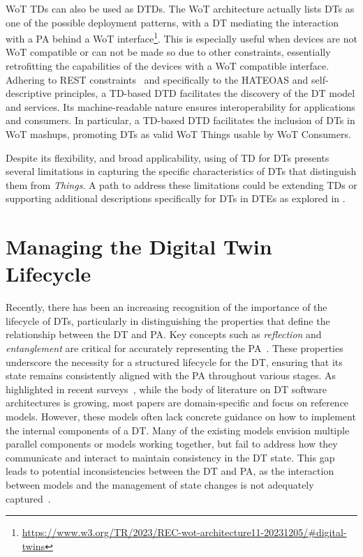 \ac{WoT} \acp{TD} can also be used as \acp{DTD}.
The \ac{WoT} architecture actually lists \acp{DT} as one of the possible deployment patterns, with a \ac{DT} mediating the interaction with a \ac{PA} behind a \ac{WoT} interface\footnote{\url{https://www.w3.org/TR/2023/REC-wot-architecture11-20231205/\#digital-twins}}.
%
This is especially useful when devices are not \ac{WoT} compatible or can not be made so due to other constraints, essentially retrofitting the capabilities of the devices with a \ac{WoT} compatible interface.
%
Adhering to \ac{REST} constraints~\cite{fielding2000architectural} and specifically to the HATEOAS and self-descriptive principles, a \ac{TD}-based \ac{DTD} facilitates the discovery of the \ac{DT} model and services.
%
Its machine-readable nature ensures interoperability for applications and consumers.
%
In particular, a \ac{TD}-based \ac{DTD} facilitates the inclusion of \acp{DT} in \ac{WoT} mashups, promoting \acp{DT} as valid \ac{WoT} Things usable by \ac{WoT} Consumers.

Despite its flexibility,
and broad applicability, 
using of \ac{TD} for \acp{DT} presents several limitations in capturing the specific characteristics of \acp{DT} that distinguish them from \emph{Things}.
%
A path to address these limitations could be extending \acp{TD} or supporting additional descriptions specifically for \acp{DT} in \acp{DTE} as explored in .



\section{Managing the Digital Twin Lifecycle}
\label{sec:dte:engineering-dt:dt-lifecycle}


Recently, there has been an increasing recognition of the importance of the lifecycle of \acp{DT},
particularly in distinguishing the properties that define the relationship between the \ac{DT} and \ac{PA}. 
%
Key concepts such as \emph{reflection} and \emph{entanglement} are critical for accurately representing the \ac{PA}~\cite{dt-IoT-context-Minerva-2020,web-of-dt-ricci-2022}.
%
These properties underscore the necessity for a structured lifecycle for the \ac{DT}, ensuring that its state remains consistently aligned with the \ac{PA} throughout various stages.
%
As highlighted in recent surveys~\cite{ferko2022architecting, 9640612,Hribernik_Cabri_Mandreoli_Mentzas_2021}, while the body of literature on \ac{DT} software architectures is growing, most papers are domain-specific and focus on reference models.
%
However, these models often lack concrete guidance on how to implement the internal components of a \ac{DT}. Many of the existing models envision multiple parallel components or models working together, but fail to address how they communicate and interact to maintain consistency in the \ac{DT} state.
This gap leads to potential inconsistencies between the \ac{DT} and \ac{PA}, as the interaction between models and the management of state changes is not adequately captured~\cite{alam2017access,Malakuti2019fourlayer,Lpez2021}.




